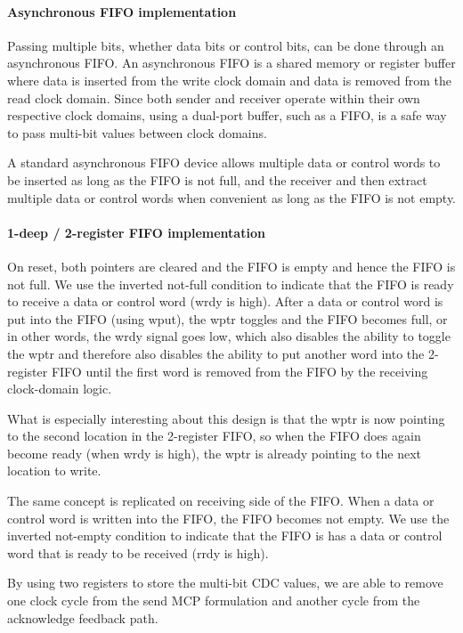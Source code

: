 \paragraph{Asynchronous FIFO implementation}
Passing multiple bits, whether data bits or control bits, can be done through an asynchronous FIFO. An asynchronous FIFO is a shared memory or register buffer where data is inserted from the write clock domain and data is removed from the read clock domain. Since both sender and receiver operate within their own respective clock domains, using a dual-port buffer, such as a FIFO, is a safe way to pass multi-bit values between clock domains.


A standard asynchronous FIFO device allows multiple data or control words to be inserted as long as the FIFO is not full, and the receiver and then extract multiple data or control words when convenient as long as the FIFO is not empty.


\paragraph{1-deep / 2-register FIFO implementation}

On reset, both pointers are cleared and the FIFO is empty and hence the FIFO is not full. We use the inverted not-full condition to indicate that the FIFO is ready to receive a data or control word (wrdy is high). After a data or control word is put into the FIFO (using wput), the wptr toggles and the FIFO becomes full, or in other words, the wrdy signal goes low, which also disables the ability to toggle the wptr and therefore also disables the ability to put another word into the 2-register FIFO until the first word is removed from the FIFO by the receiving clock-domain logic.

\par What is especially interesting about this design is that the wptr is now pointing to the second location in the 2-register FIFO, so when the FIFO does again become ready (when wrdy is high), the wptr is already pointing to the next location to write.

\par The same concept is replicated on receiving side of the FIFO. When a data or control word is
written into the FIFO, the FIFO becomes not empty. We use the inverted not-empty condition to
indicate that the FIFO is has a data or control word that is ready to be received (rrdy is high).

\par By using two registers to store the multi-bit CDC values, we are able to remove one clock cycle from the send MCP formulation and another cycle from the acknowledge feedback path.

